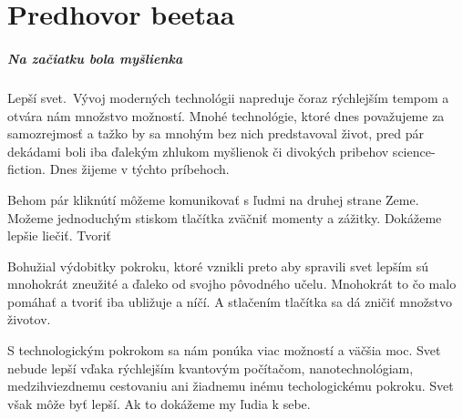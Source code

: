 \chapter{Predhovor beetaa}

\paragraph{Na začiatku bola myšlienka}
Lepší svet.\
Vývoj moderných technológii napreduje čoraz rýchlejším tempom a otvára nám množstvo možností. Mnohé technológie, ktoré dnes považujeme za samozrejmosť a tažko by sa mnohým bez nich predstavoval život, pred pár dekádami boli iba ďalekým zhlukom myšlienok či divokých pribehov science-fiction. Dnes žijeme v týchto príbehoch. \

Behom pár kliknútí môžeme komunikovať s ľudmi na druhej strane Zeme. Možeme jednoduchým stiskom tlačítka zväčniť momenty a zážitky. Dokážeme lepšie liečiť. Tvoriť

Bohužial výdobitky pokroku, ktoré vznikli preto aby spravili svet lepším sú mnohokrát zneužité a ďaleko od svojho pôvodného učelu. Mnohokrát to čo malo pomáhať a tvoriť iba ubližuje a níčí. A stlačením tlačítka sa dá zničiť množstvo životov. \


S technologickým pokrokom sa nám ponúka viac možností a väčšia moc. Svet nebude lepší vďaka rýchlejším kvantovým počítačom, nanotechnológiam, medzihviezdnemu cestovaniu ani žiadnemu inému techologickému pokroku. Svet však môže byť lepší. Ak to dokážeme my ľudia k sebe.








